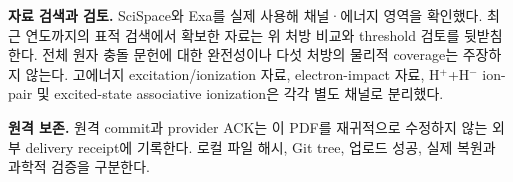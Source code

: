 \documentclass[11pt,a4paper]{article}
\begin{document}
\textbf{자료 검색과 검토.} SciSpace와 Exa를 실제 사용해 채널·에너지 영역을 확인했다. 최근 연도까지의 표적 검색에서 확보한 자료는 위 처방 비교와 threshold 검토를 뒷받침한다. 전체 원자 충돌 문헌에 대한 완전성이나 다섯 처방의 물리적 coverage는 주장하지 않는다. 고에너지 excitation/ionization 자료, electron-impact 자료, H$^+$+H$^-$ ion-pair 및 excited-state associative ionization은 각각 별도 채널로 분리했다.

\textbf{원격 보존.} 원격 commit과 provider ACK는 이 PDF를 재귀적으로 수정하지 않는 외부 delivery receipt에 기록한다. 로컬 파일 해시, Git tree, 업로드 성공, 실제 복원과 과학적 검증을 구분한다.
\end{document}
